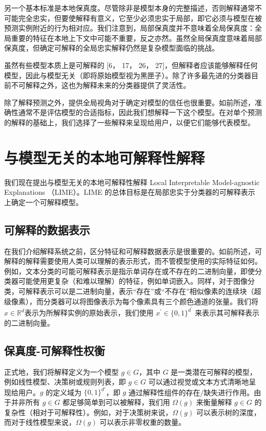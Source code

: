 \documentclass[12pt, a4paper]{ctexart} %
\begin{document}
另一个基本标准是本地保真度。尽管除非是模型本身的完整描述，否则解释通常不可能完全忠实，但要使解释有意义，它至少必须忠实于局部，即它必须与模型在被预测实例附近的行为相对应。我们注意到，局部保真度并不意味着全局保真度：全局重要的特征在本地上下文中可能不重要，反之亦然。虽然全局保真度意味着局部保真度，但确定可解释的全局忠实解释仍然是复杂模型面临的挑战。

虽然有些模型本质上是可解释的 [6， 17， 26， 27]，但解释者应该能够解释任何模型，因此与模型无关（即将原始模型视为黑匣子）。除了许多最先进的分类器目前不可解释之外，这也为解释未来的分类器提供了灵活性。

除了解释预测之外，提供全局视角对于确定对模型的信任也很重要。如前所述，准确性通常不是评估模型的合适指标，因此我们想解释一下这个模型。在对单个预测的解释的基础上，我们选择了一些解释来呈现给用户，以便它们能够代表模型。

\section{与模型无关的本地可解释性解释}
我们现在提出与模型无关的本地可解释性解释 Local Interpretable Model-agnostic Explanations （LIME）。LIME 的总体目标是在局部忠实于分类器的可解释表示上确定一个可解释模型。
\subsection{可解释的数据表示}
在我们介绍解释系统之前，区分特征和可解释数据表示是很重要的。如前所述，可解释的解释需要使用人类可以理解的表示形式，而不管模型使用的实际特征如何。例如，文本分类的可能可解释表示是指示单词存在或不存在的二进制向量，即使分类器可能使用更复杂（和难以理解）的特征，例如单词嵌入。同样，对于图像分类，可解释表示可以是二进制向量，表示“存在”或“不存在”相似像素的连续块（超级像素），而分类器可以将图像表示为每个像素具有三个颜色通道的张量。我们将$x\in\mathbb{R}^d$表示为所解释实例的原始表示，我们使用 $x^{\prime}\in\{0,1\}^{d^{\prime}}$ 来表示其可解释表示的二进制向量。
\subsection{保真度-可解释性权衡}
正式地，我们将解释定义为一个模型 \( g \in G \)，其中 \( G \) 是一类潜在可解释的模型，例如线性模型、决策树或规则列表，即 \( g \in G \) 可以通过视觉或文本方式清晰地呈现给用户。\( g \) 的定义域为 \( \{0,1\}^{d'} \)，即 \( g \) 通过解释性组件的存在/缺失进行作用。由于并非所有 \( g \in G \) 都足够简单到可以被解释，我们用 \( \Omega(g) \) 来衡量解释 \( g \in G \) 的复杂性（相对于可解释性）。例如，对于决策树来说，\( \Omega(g) \) 可以表示树的深度，而对于线性模型来说，\( \Omega(g) \) 可以表示非零权重的数量。
\end{document}
